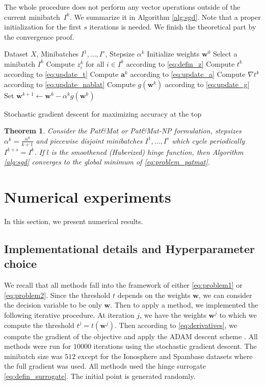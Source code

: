 \documentclass[]{interact}
\theoremstyle{plain}%
\newtheorem{theorem}{Theorem}[section]
\theoremstyle{definition}
\theoremstyle{remark}
\newcommand{\apatmat}{Pat\&Mat\xspace}
\newcommand{\anpB}{Pat\&Mat-NP\xspace}
\newcommand{\NEW}[1]{{\color{blue} #1}}
\begin{document}
The whole procedure does not perform any vector operations outside of the current minibatch~$I^k$. We summarize it in Algorithm \ref{alg:sgd}. Note that a proper initialization for the first $s$ iterations is needed. We finish the theoretical part by the convergence proof.

\begin{algorithm}[!ht]
\begin{algorithmic}[1]
\Require Dataset $X$, Minibatches $I^1,\dots,I^s$, Stepsize $\alpha^k$
\State Initialize weights $\bm w^0$
\State Select a minibatch $I^k$
\State Compute $z_i^k$ for all $i\in I^k$ according to \eqref{eq:defin_z}
\State Compute $t^k$ according to \eqref{eq:update_t}
\State Compute $\bm a^k$ according to \eqref{eq:update_a}
\State Compute $\nabla t^k$ according to \eqref{eq:update_nablat}
\State Compute $g(\bm w^k)$ according to \eqref{eq:update_g}
\State Set $\bm w^{k+1}\gets \bm w^k - \alpha^k g(\bm w^k)$
\EndFor
\end{algorithmic}
\caption{Stochastic gradient descent for maximizing accuracy at the top}
\label{alg:sgd}
\end{algorithm}

\begin{theorem}\label{thm:sgd}
  Consider the \apatmat or \anpB formulation, stepsizes $\alpha^k=\frac{\alpha^0}{k+1}$ and piecewise disjoint minibatches $I^1,\dots,I^s$ which cycle periodically $I^{k+s}=I^k$. If $l$ is the smoothened (Huberized) hinge function, then Algorithm \ref{alg:sgd} converges to the global minimum of \eqref{eq:problem_patmat}.  
\end{theorem}





\section{Numerical experiments}\label{sec:num1}

In this section, we present numerical results.


\subsection{Implementational details and Hyperparameter choice}


We recall that all methods fall into the framework of either \eqref{eq:problem1} or \eqref{eq:problem2}. Since the threshold $t$ depends on the weights $\bm w$, we can consider the decision variable to be only $\bm w$. Then to apply a method, we implemented the following iterative procedure. At iteration $j$, we have the weights $\bm w^j$ to which we compute the threshold $t^j=t(\bm w^j)$. Then according to \eqref{eq:derivatives}, we compute the gradient of the objective and apply the ADAM descent scheme \citep{kingma2014adam}. \NEW{All methods were run for $10000$ iterations using the stochastic gradient descent. The minibatch size was $512$ except for the Ionosphere and Spambase datasets where the full gradient was used.} All methods used the hinge surrogate \eqref{eq:defin_surrogate}. The initial point is generated randomly.
\end{document}
